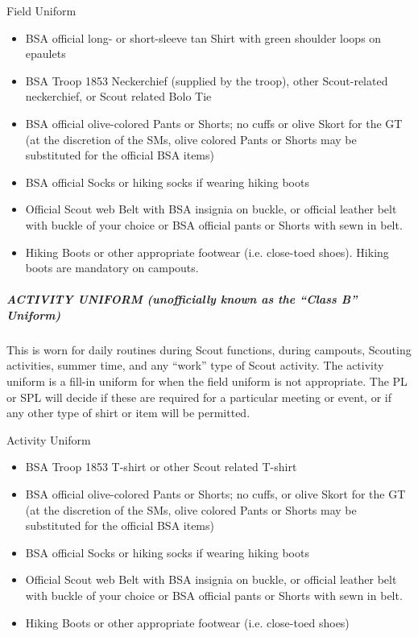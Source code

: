 \documentclass{ltxguide}
\begin{document}
Field Uniform
\begin{itemize}
	\item \ac{BSA} official long- or short-sleeve tan Shirt with green shoulder loops on epaulets
	\item \ac{BSA} Troop 1853 Neckerchief (supplied by the troop), other Scout-related neckerchief, or Scout related Bolo Tie
	\item \ac{BSA} official olive-colored Pants or Shorts; no cuffs or olive Skort for the \ac{GT} (at the discretion of the SMs, olive colored Pants or Shorts may be substituted for the official \ac{BSA} items)
	\item \ac{BSA} official Socks or hiking socks if wearing hiking boots
	\item Official Scout web Belt with \ac{BSA} insignia on buckle, or official leather belt with buckle of your choice or \ac{BSA} official pants or Shorts with sewn in belt.
	\item Hiking Boots or other appropriate footwear (i.e. close-toed shoes). Hiking boots are mandatory on campouts.
\end{itemize}

\subparagraph{ACTIVITY UNIFORM (unofficially known as the “Class B” Uniform)}
This is worn for daily routines during Scout functions, during campouts, Scouting activities, summer time, and any “work” type of Scout activity. The activity uniform is a fill-in uniform for when the field uniform is not appropriate. The \ac{PL} or \ac{SPL} will decide if these are required for a particular meeting or event, or if any other type of shirt or item will be permitted.

Activity Uniform
\begin{itemize}
	\item \ac{BSA} Troop 1853 T-shirt or other Scout related T-shirt
	\item \ac{BSA} official olive-colored Pants or Shorts; no cuffs, or olive Skort for the \ac{GT} (at the discretion of the SMs, olive colored Pants or Shorts may be substituted for the official \ac{BSA} items)
	\item \ac{BSA} official Socks or hiking socks if wearing hiking boots
	\item Official Scout web Belt with \ac{BSA} insignia on buckle, or official leather belt with buckle of your choice or \ac{BSA} official pants or Shorts with sewn in belt.
	\item Hiking Boots or other appropriate footwear (i.e. close-toed shoes)
\end{itemize}
\end{document}
